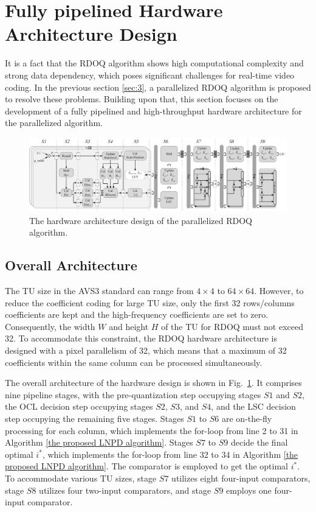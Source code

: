 \documentclass[lettersize,journal]{IEEEtran}
\begin{document}
\section{Fully pipelined Hardware Architecture Design}
It is a fact that the RDOQ algorithm shows high computational complexity and strong data dependency, which poses significant challenges for real-time video coding. In the previous section \ref{sec:3}, a parallelized RDOQ algorithm is proposed to resolve these problems. Building upon that, this section focuses on the development of a fully pipelined and high-throughput hardware architecture for the parallelized algorithm. 
\par
\begin{figure}[htbp]
	\centering
	\centerline{\includegraphics[width=1.00\textwidth]{pic_pan/overall_architecture.png}} 
	\caption{The hardware architecture design of the parallelized RDOQ algorithm.}
	\label{overall_architecture} %
\end{figure}

\subsection{Overall Architecture}
The TU size in the AVS3 standard can range from $4\times4$ to $64\times64$. However, to reduce the coefficient coding for large TU size, only the first 32 rows/columns coefficients are kept and the high-frequency coefficients are set to zero. Consequently, the width $W$ and height $H$ of the TU for RDOQ must not exceed 32. To accommodate this constraint, the RDOQ hardware architecture is designed with a pixel parallelism of 32, which means that a maximum of 32 coefficients within the same column can be processed simultaneously. 

The overall architecture of the hardware design is shown in Fig.~\ref{overall_architecture}. It comprises nine pipeline stages, with the pre-quantization step occupying stages $S1$ and $S2$, the OCL decision step occupying stages $S2$, $S3$, and $S4$, and the LSC decision step occupying the remaining five stages. Stages $S1$ to $S6$ are on-the-fly processing for each column, which implements the for-loop from line 2 to 31 in Algorithm \ref{the proposed LNPD algorithm}. Stages $S7$ to $S9$ decide the final optimal $i_{}^{*}$, which implements the for-loop from line 32 to 34 in Algorithm \ref{the proposed LNPD algorithm}. The comparator is employed to get the optimal $i_{}^{*}$. To accommodate various TU sizes, stage $S7$ utilizes eight four-input comparators, stage $S8$ utilizes four two-input comparators, and stage $S9$ employs one four-input comparator. 
\end{document}
